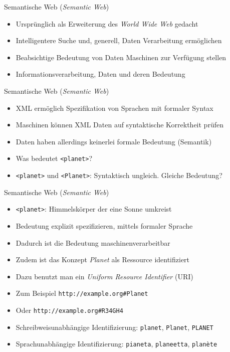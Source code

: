 \documentclass{beamer}
\begin{document}
\begin{frame}{Semantische Web (\emph{Semantic Web})}
	
	\begin{itemize}
		\item Ursprünglich als Erweiterung des \emph{World Wide Web} gedacht
		\item Intelligentere Suche und, generell, Daten Verarbeitung ermöglichen
		\item Beabsichtige Bedeutung von Daten Maschinen zur Verfügung stellen
		\item Informationsverarbeitung, Daten und deren Bedeutung
	\end{itemize}
	
\end{frame}

\begin{frame}{Semantische Web (\emph{Semantic Web})}
	
	\begin{itemize}
		\item XML ermöglich Spezifikation von Sprachen mit formaler Syntax
		\item Maschinen können XML Daten auf syntaktische Korrektheit prüfen
		\item Daten haben allerdings keinerlei formale Bedeutung (Semantik)
		\item Was bedeutet \texttt{<planet>}? 
		\item \texttt{<planet>} und \texttt{<Planet>}: Syntaktisch ungleich. Gleiche Bedeutung?
	\end{itemize}
	
\end{frame}

\begin{frame}{Semantische Web (\emph{Semantic Web})}
	
	\begin{itemize}
		\item \texttt{<planet>}: Himmelskörper der eine Sonne umkreist
		\item Bedeutung explizit spezifizieren, mittels formaler Sprache
		\item Dadurch ist die Bedeutung maschinenverarbeitbar
		\item Zudem ist das Konzept \emph{Planet} als Ressource identifiziert
		\item Dazu benutzt man ein \emph{Uniform Resource Identifier} (URI)
		\item Zum Beispiel \texttt{http://example.org\#Planet}
		\item Oder \texttt{http://example.org\#R34GH4}
		\item Schreibweisunabhängige Identifizierung: \texttt{planet}, \texttt{Planet}, \texttt{PLANET}
		\item Sprachunabhängige Identifizierung: \texttt{pianeta}, \texttt{planeetta}, \texttt{planète}
	\end{itemize}
	
\end{frame}
\end{document}
